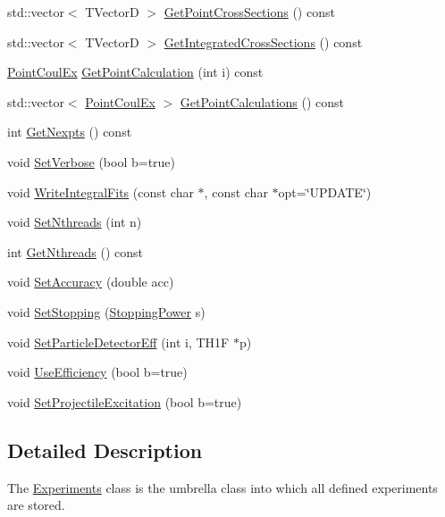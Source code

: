 \begin{DoxyCompactItemize}
\item 
std\-::vector$<$ T\-Vector\-D $>$ \hyperlink{classExperiments_a536e796fba4df63d62c9f3277f910a73}{Get\-Point\-Cross\-Sections} () const 
\item 
std\-::vector$<$ T\-Vector\-D $>$ \hyperlink{classExperiments_a47a82e8b042491288d6b900ad9198c35}{Get\-Integrated\-Cross\-Sections} () const 
\item 
\hyperlink{classPointCoulEx}{Point\-Coul\-Ex} \hyperlink{classExperiments_ad4c9c3bcb227b9982d52654e28dab360}{Get\-Point\-Calculation} (int i) const 
\item 
std\-::vector$<$ \hyperlink{classPointCoulEx}{Point\-Coul\-Ex} $>$ \hyperlink{classExperiments_aed971cdffd3863f01d1246b3810ad190}{Get\-Point\-Calculations} () const 
\item 
int \hyperlink{classExperiments_a6e6df0546be0608c2ff936f7bbf3a0bb}{Get\-Nexpts} () const 
\item 
void \hyperlink{classExperiments_a5bc069b7d1388ed1aac87600bff18b43}{Set\-Verbose} (bool b=true)
\item 
void \hyperlink{classExperiments_add6a2b8636244411a03515f396b3603d}{Write\-Integral\-Fits} (const char $\ast$, const char $\ast$opt=\char`\"{}U\-P\-D\-A\-T\-E\char`\"{})
\item 
void \hyperlink{classExperiments_ac8f99d06ff63f2e0fda80ad647edd3b6}{Set\-Nthreads} (int n)
\item 
int \hyperlink{classExperiments_a0b5789577937188a891a2c5e70b3c8e6}{Get\-Nthreads} () const 
\item 
void \hyperlink{classExperiments_a8aa4eb6fa6131902a90a4c602bb055f7}{Set\-Accuracy} (double acc)
\item 
void \hyperlink{classExperiments_a777e9756290797247971042c4e64ed9e}{Set\-Stopping} (\hyperlink{classStoppingPower}{Stopping\-Power} s)
\item 
void \hyperlink{classExperiments_a50e179731fa9b2c693badaefd9b698cc}{Set\-Particle\-Detector\-Eff} (int i, T\-H1\-F $\ast$p)
\item 
void \hyperlink{classExperiments_a7902dd87eee8cf24ded441ba889f97fb}{Use\-Efficiency} (bool b=true)
\item 
void \hyperlink{classExperiments_a2766ab644312a272bde08e4abfa02c18}{Set\-Projectile\-Excitation} (bool b=true)
\end{DoxyCompactItemize}


\subsection{Detailed Description}
The \hyperlink{classExperiments}{Experiments} class is the umbrella class into which all defined experiments are stored. 


